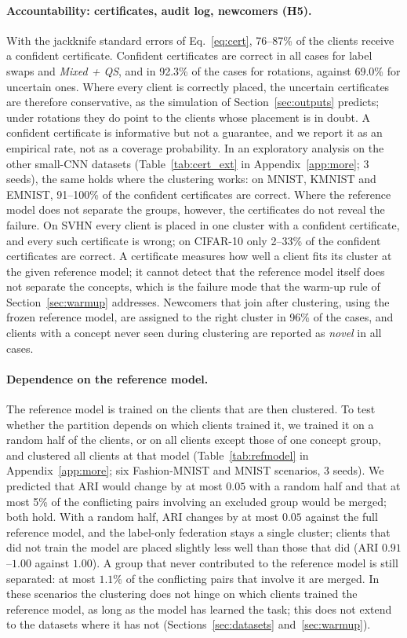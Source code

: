 \paragraph{Accountability: certificates, audit log, newcomers (H5).}
With the jackknife standard errors of Eq.~\eqref{eq:cert}, 76--87\% of the clients receive a confident certificate. Confident certificates are correct in all cases for label swaps and \emph{Mixed + QS}, and in 92.3\% of the cases for rotations, against 69.0\% for uncertain ones. Where every client is correctly placed, the uncertain certificates are therefore conservative, as the simulation of Section~\ref{sec:outputs} predicts; under rotations they do point to the clients whose placement is in doubt. A confident certificate is informative but not a guarantee, and we report it as an empirical rate, not as a coverage probability. In an exploratory analysis on the other small-CNN datasets (Table~\ref{tab:cert_ext} in Appendix~\ref{app:more}; 3 seeds), the same holds where the clustering works: on MNIST, KMNIST and EMNIST, 91--100\% of the confident certificates are correct. Where the reference model does not separate the groups, however, the certificates do not reveal the failure. On SVHN every client is placed in one cluster with a confident certificate, and every such certificate is wrong; on CIFAR-10 only 2--33\% of the confident certificates are correct. A certificate measures how well a client fits its cluster at the given reference model; it cannot detect that the reference model itself does not separate the concepts, which is the failure mode that the warm-up rule of Section~\ref{sec:warmup} addresses. Newcomers that join after clustering, using the frozen reference model, are assigned to the right cluster in 96\% of the cases, and clients with a concept never seen during clustering are reported as \emph{novel} in all cases.

\paragraph{Dependence on the reference model.} The reference model is trained on the clients that are then clustered. To test whether the partition depends on which clients trained it, we trained it on a random half of the clients, or on all clients except those of one concept group, and clustered all clients at that model (Table~\ref{tab:refmodel} in Appendix~\ref{app:more}; six Fashion-MNIST and MNIST scenarios, 3 seeds). We predicted that ARI would change by at most $0.05$ with a random half and that at most 5\% of the conflicting pairs involving an excluded group would be merged; both hold. With a random half, ARI changes by at most $0.05$ against the full reference model, and the label-only federation stays a single cluster; clients that did not train the model are placed slightly less well than those that did (ARI $0.91$--$1.00$ against $1.00$). A group that never contributed to the reference model is still separated: at most $1.1\%$ of the conflicting pairs that involve it are merged. In these scenarios the clustering does not hinge on which clients trained the reference model, as long as the model has learned the task; this does not extend to the datasets where it has not (Sections~\ref{sec:datasets} and~\ref{sec:warmup}).

